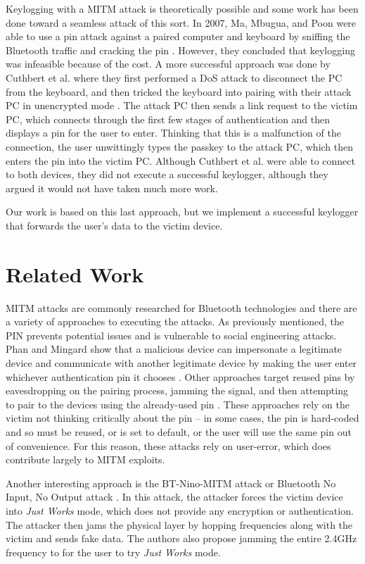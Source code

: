 \documentclass{acm_proc_article-sp}
\begin{document}
Keylogging with a MITM attack is theoretically possible and some work has been done toward a seamless attack of this sort. In 2007, Ma, Mbugua, and Poon were able to use a pin attack against a paired computer and keyboard by sniffing the Bluetooth traffic and cracking the pin \cite{ma2007keystroke}. However, they concluded that keylogging was infeasible because of the cost. A more successful approach was done by Cuthbert et al. where they first performed a DoS attack to disconnect the PC from the keyboard, and then tricked the keyboard into pairing with their attack PC in unencrypted mode \cite{cuthbertbluetooth}. The attack PC then sends a link request to the victim PC, which connects through the first few stages of authentication and then displays a pin for the user to enter. Thinking that this is a malfunction of the connection, the user unwittingly types the passkey to the attack PC, which then enters the pin into the victim PC. Although Cuthbert et al. were able to connect to both devices, they did not execute a successful keylogger, although they argued it would not have taken much more work. 

Our work is based on this last approach, but we implement a successful keylogger that forwards the user's data to the victim device.

\section{Related Work}
MITM attacks are commonly researched for Bluetooth technologies and there are a variety of approaches to executing the attacks. As previously mentioned, the PIN prevents potential issues and is vulnerable to social engineering attacks. Phan and Mingard show that a malicious device can impersonate a legitimate device and communicate with another legitimate device by making the user enter whichever authentication pin it chooses \cite{phan2012analyzing}. Other approaches target reused pins by eavesdropping on the pairing process, jamming the signal, and then attempting to pair to the devices using the already-used pin \cite{barnickel2012implementing}. These approaches rely on the victim not thinking critically about the pin -- in some cases, the pin is hard-coded and so must be reused, or is set to default, or the user will use the same pin out of convenience. For this reason, these attacks rely on user-error, which does contribute largely to MITM exploits.  

Another interesting approach is the BT-Nino-MITM attack or Bluetooth No Input, No Output attack \cite{4401672}
. In this attack, the attacker forces the victim device into \textit{Just Works} mode, which does not provide any encryption or authentication. The attacker then jams the physical layer by hopping frequencies along with the victim and sends fake data. The authors also propose jamming the entire 2.4GHz frequency to for the user to try \textit{Just Works} mode. 
\end{document}
